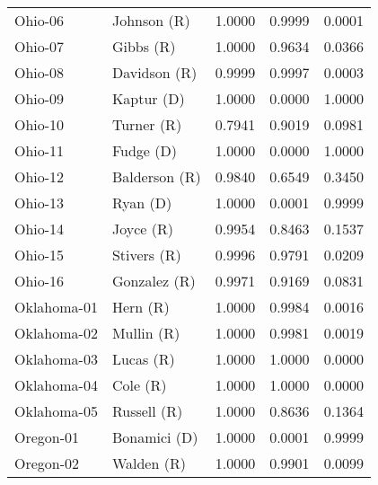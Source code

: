\begin{longtable}{llrll}
           Ohio-06 &          {\color{Red} Johnson (R)} &       1.0000 &        0.9999 &        0.0001 \\
           Ohio-07 &            {\color{Red} Gibbs (R)} &       1.0000 &        0.9634 &        0.0366 \\
           Ohio-08 &         {\color{Red} Davidson (R)} &       0.9999 &        0.9997 &        0.0003 \\
           Ohio-09 &          {\color{Blue} Kaptur (D)} &       1.0000 &        0.0000 &        1.0000 \\
           Ohio-10 &           {\color{Red} Turner (R)} &       0.7941 &        0.9019 &        0.0981 \\
           Ohio-11 &           {\color{Blue} Fudge (D)} &       1.0000 &        0.0000 &        1.0000 \\
           Ohio-12 &        {\color{Red} Balderson (R)} &       0.9840 &        0.6549 &        0.3450 \\
           Ohio-13 &            {\color{Blue} Ryan (D)} &       1.0000 &        0.0001 &        0.9999 \\
           Ohio-14 &            {\color{Red} Joyce (R)} &       0.9954 &        0.8463 &        0.1537 \\
           Ohio-15 &          {\color{Red} Stivers (R)} &       0.9996 &        0.9791 &        0.0209 \\
           Ohio-16 &         {\color{Red} Gonzalez (R)} &       0.9971 &        0.9169 &        0.0831 \\
       Oklahoma-01 &             {\color{Red} Hern (R)} &       1.0000 &        0.9984 &        0.0016 \\
       Oklahoma-02 &           {\color{Red} Mullin (R)} &       1.0000 &        0.9981 &        0.0019 \\
       Oklahoma-03 &            {\color{Red} Lucas (R)} &       1.0000 &        1.0000 &        0.0000 \\
       Oklahoma-04 &             {\color{Red} Cole (R)} &       1.0000 &        1.0000 &        0.0000 \\
       Oklahoma-05 &          {\color{Red} Russell (R)} &       1.0000 &        0.8636 &        0.1364 \\
         Oregon-01 &        {\color{Blue} Bonamici (D)} &       1.0000 &        0.0001 &        0.9999 \\
         Oregon-02 &           {\color{Red} Walden (R)} &       1.0000 &        0.9901 &        0.0099 \\

\end{longtable}
